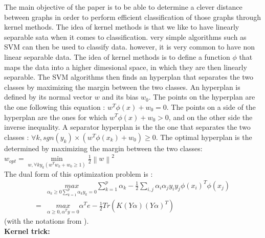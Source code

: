 \documentclass[a4paper,11pt]{article}
\begin{document}
The main objective of the paper is to be able to determine a clever distance between graphs in order to perform efficient classification of those graphs through kernel methods. 
The idea of kernel methods is that we like to have linearly separable sata when it comes to classification. 
very simple algorithms such as SVM can then be used to classify data. 
however, it is very common to have non linear separable data. 
The idea of kernel methods is to define a function $\phi$ that maps the data into a higher dimesional space, in which they are then linearly separable. 
The SVM algorithms then finds an hyperplan that separates the two classes by maximizing the margin between the two classes.
An hyperplan is defined by its normal vector $w$ and its bias $w_0$.
The points on the hyperplan are the one following this equation : $w^T \phi(x) + w_0 = 0$.
The points on a side of the hyperplan are the ones for which $w^T \phi(x) + w_0 > 0$, and on the other side the inverse inequality. 
A separator hyperplan is the the one that separates the two classes : $\forall k, sgn(y_k) \times (w^T\phi(x_k)+w_0) \geq 0 $. 
The optimal hyperplan is the determined by maximizing the margin between the two classes:  \\

$w_{opt} =  \underset{w, \forall k y_k(w^Tw_k+w_0 \geq 1)}{\operatorname{min}}  \frac{1}{2} \left\lVert w\right\rVert^2 $\\[0.2cm]

The dual form of this optimization problem is : \\

\begin{align}
     & \underset{\alpha_k \geq 0 \sum_{k=1}^{p} \alpha_k y_k = 0 }{ max }   \sum_{k=1}^{p} \alpha_k -\frac{1}{2}  \sum_{i,j} \alpha_i \alpha_j y_i y_j \phi(x_i)^T \phi(x_j) \\
    = & \underset{\alpha \geq 0, \alpha^T y = 0 }{max}  \alpha^T e - \frac{1}{2}Tr(K(Y\alpha)(Y \alpha)^T) 
\end{align}
(with the notations from \cite{lanckriet2004learning}).\\[1cm]

\textbf{Kernel trick: } \\
\end{document}
